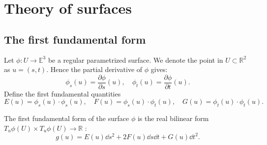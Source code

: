 \section{Theory of surfaces}
\label{sec:Theory of surfaces}

\subsection{The first fundamental form}
\label{sub:The first fundamental form}

Let $\phi: U\to \mathbb{E}^3$ be a regular parametrized surface.
We denote the point in $U \subset \mathbb{R}^2$ as $u=(s,t)$.
Hence the partial derivative of  $\phi$ gives:
 \[
\phi_s(u) = \frac{\partial\phi}{\partial s}(u),\quad
\phi_t(u) = \frac{\partial\phi}{\partial t}(u).
\]
Define the first fundamental quantities
\[
E(u) = \phi_s(u)\cdot \phi_s(u), \quad
F(u) = \phi_s(u)\cdot \phi_t(u), \quad
G(u) = \phi_t(u)\cdot \phi_t(u). 
\]

The first fundamental form of the surface $\phi$ is the
real bilinear form $T_u\phi(U)\times T_u\phi(U)\to \mathbb{R}$ :
 \[
g(u) = E(u)\dd s^2 + 2F(u) \dd s \dd t + G(u)\dd t^2.
\]

